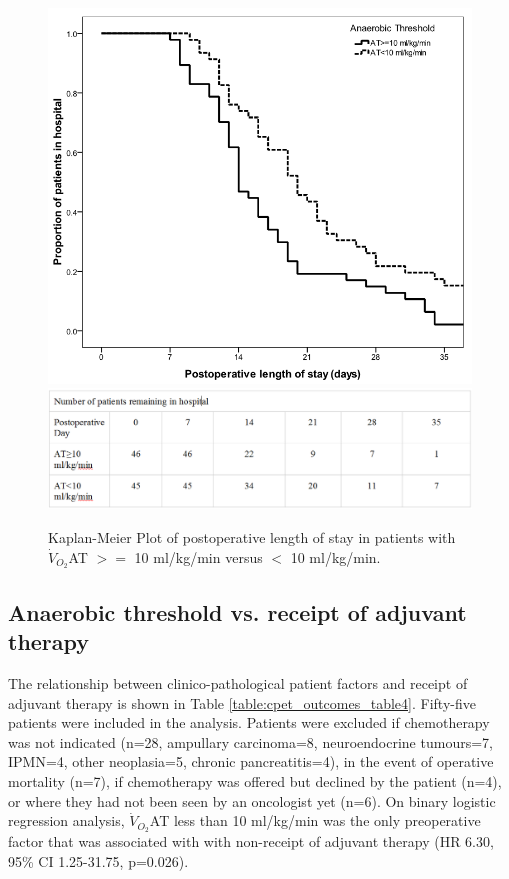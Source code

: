 

\begin{figure}[p]
\centering
\includegraphics[width=\textwidth]{Figures/cpet_outcomes_km_at_los}
\includegraphics[width=\textwidth]{Figures/cpet_outcomes_km_at_los_table} %
\caption{Kaplan-Meier Plot of postoperative length of stay in patients with $\dot{V}_{O_2}$AT $>=$ 10 ml/kg/min versus $<$ 10 ml/kg/min.}
\label{fig:cpet_outcomes_km_at_los}
\end{figure}

\subsection{Anaerobic threshold vs. receipt of adjuvant therapy}
The relationship between clinico-pathological patient factors and receipt of adjuvant therapy is shown in Table \ref{table:cpet_outcomes_table4}. 
Fifty-five patients were included in the analysis. 
Patients were excluded if chemotherapy was not indicated (n=28, ampullary carcinoma=8, neuroendocrine tumours=7, IPMN=4, other neoplasia=5, chronic pancreatitis=4), in the event of operative mortality (n=7), if chemotherapy was offered but declined by the patient (n=4), or where they had not been seen by an oncologist yet (n=6). 
On binary logistic regression analysis, $\dot{V}_{O_2}$AT less than 10 ml/kg/min was the only preoperative factor that was associated with with non-receipt of adjuvant therapy (HR 6.30, 95\% CI 1.25-31.75, p=0.026). 

